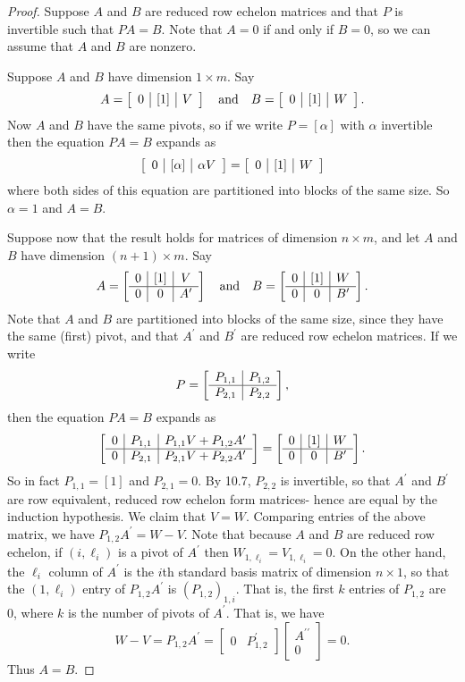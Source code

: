 \documentclass{memoir}
\begin{document}
\begin{proof}
Suppose $A$ and $B$ are reduced row echelon matrices and that $P$ is invertible such that $PA = B$. Note that $A = 0$ if and only if $B = 0$, so we can assume that $A$ and $B$ are nonzero.

Suppose $A$ and $B$ have dimension $1 \times m$. Say \[ A = \left[ \begin{array}{c|c|c} 0 & [1] & V \end{array} \right] \quad \mathrm{and} \quad B = \left[ \begin{array}{c|c|c} 0 & [1] & W \end{array} \right]. \] Now $A$ and $B$ have the same pivots, so if we write $P = [\alpha]$ with $\alpha$ invertible then the equation $PA = B$ expands as \[ \left[ \begin{array}{c|c|c} 0 & [\alpha] & \alpha V \end{array} \right] = \left[ \begin{array}{c|c|c} 0 & [1] & W \end{array} \right] \] where both sides of this equation are partitioned into blocks of the same size. So $\alpha = 1$ and $A = B$.

Suppose now that the result holds for matrices of dimension $n \times m$, and let $A$ and $B$ have dimension $(n+1) \times m$. Say \[ A = \left[ \begin{array}{c|c|c} 0 & [1] & V \\ \hline 0 & 0 & A^\prime \end{array} \right] \quad \mathrm{and} \quad B = \left[ \begin{array}{c|c|c} 0 & [1] & W \\ \hline 0 & 0 & B^\prime \end{array} \right]. \] Note that $A$ and $B$ are partitioned into blocks of the same size, since they have the same (first) pivot, and that $A^\prime$ and $B^\prime$ are reduced row echelon matrices. If we write \[ P = \left[ \begin{array}{c|c} P_{1,1} & P_{1,2} \\ \hline P_{2,1} & P_{2,2} \end{array} \right], \] then the equation $PA = B$ expands as \[ \left[ \begin{array}{c|c|c} 0 & P_{1,1} & P_{1,1}V + P_{1,2}A^\prime \\ \hline 0 & P_{2,1} & P_{2,1}V + P_{2,2}A^\prime \end{array} \right] = \left[ \begin{array}{c|c|c} 0 & [1] & W \\ \hline 0 & 0 & B^\prime \end{array} \right]. \] So in fact $P_{1,1} = [1]$ and $P_{2,1} = 0$. By 10.7, $P_{2,2}$ is invertible, so that $A^\prime$ and $B^\prime$ are row equivalent, reduced row echelon form matrices- hence are equal by the induction hypothesis. We claim that $V = W$. Comparing entries of the above matrix, we have $P_{1,2}A^\prime = W - V$. Note that because $A$ and $B$ are reduced row echelon, if $(i,\ell_i)$ is a pivot of $A^\prime$ then $W_{1,\ell_i} = V_{1,\ell_i} = 0$. On the other hand, the $\ell_i$ column of $A^\prime$ is the $i$th standard basis matrix of dimension $n \times 1$, so that the $(1,\ell_i)$ entry of $P_{1,2}A^\prime$ is $(P_{1,2})_{1,i}$. That is, the first $k$ entries of $P_{1,2}$ are 0, where $k$ is the number of pivots of $A^\prime$. That is, we have \[ W - V = P_{1,2}A^\prime = \left[ \begin{array}{c|c} 0 & P_{1,2}^\prime \end{array} \right] \left[ \begin{array}{c} A^{\prime\prime} \\ \hline 0 \end{array} \right] = 0. \] Thus $A = B$.
\end{proof}
\end{document}
